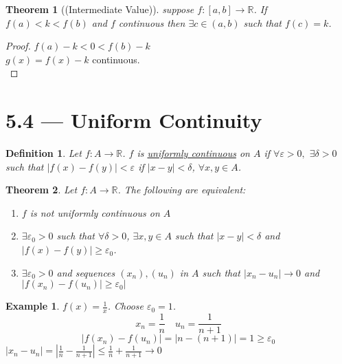 \documentclass{report}
\newcommand{\R}{\mathbb{R}}  %
\newcommand{\xn}{(x_n)}
\theoremstyle{mystyle}
\newtheorem*{theorem}{Theorem}
\newtheorem*{definition}{Definition}
\newtheorem*{example}{Example}
\theoremstyle{customtheorem}
\begin{document}
    \begin{theorem}[(Intermediate Value)]
        suppose $f:[a,b]\to\R$. If $f(a)<k<f(b)$ and $f$ continuous then $\exists c\in(a,b)$ such that $f(c)=k$.
    \end{theorem}
    \begin{proof}
        $f(a)-k<0<f(b)-k$\\
        $g(x)=f(x)-k$ continuous.\\
    \end{proof}

    \section*{5.4 --- Uniform Continuity}
    \begin{definition}
        Let $f:A\to\R$. $f$ is \ul{uniformly continuous} on $A$ if $\forall \varepsilon > 0,$ $\exists \delta > 0$ such that $\left|f(x)-f(y)\right|<\varepsilon$ if $|x-y|<\delta$, $\forall x,y\in A$.
    \end{definition}

    \begin{theorem}
        Let $f:A\to\R$. The following are equivalent:
        \begin{enumerate}[label=(\roman*)]
            \item $f$ is not uniformly continuous on $A$
            \item $\exists \varepsilon_0 > 0$ such that $\forall \delta > 0$, $\exists x,y\in A$ such that $|x-y|<\delta$ and $|f(x)-f(y)|\geq \varepsilon_0$.
            \item $\exists \varepsilon_0 > 0$ and sequences $\xn, (u_n)$ in $A$ such that $|x_n-u_n|\to 0$ and $|f\xn-f(u_n)|\geq \varepsilon_0|$
        \end{enumerate}
    \end{theorem}

    \begin{example}
        $f(x)=\frac{1}{x}$. Choose $\varepsilon_0=1$. \vspace{-1em}
        \[x_n=\frac{1}{n}\quad u_n=\frac{1}{n+1}\]
        \vspace{-1em}
        \[|f\xn-f(u_n)|=|n-(n+1)|=1\geq \varepsilon_0\]
        $|x_n-u_n|=|\frac{1}{n}-\frac{1}{n+1}|\leq \frac{1}{n}+\frac{1}{n+1}\to 0$
    \end{example}
\end{document}
